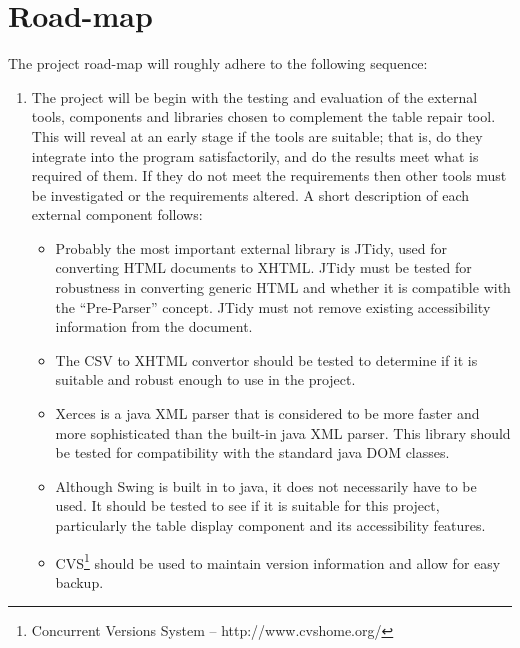 
\section{Road-map}

The project road-map will roughly adhere to the following sequence:

\begin{enumerate}

\item The project will be begin with the testing and evaluation of the external
tools, components and libraries chosen to complement the table repair tool.
This will reveal at an early stage if the tools are suitable; that is, do they
integrate into the program satisfactorily, and do the results meet what is
required of them. If they do not meet the requirements then other tools must be
investigated or the requirements altered. A short description of each external
component follows:

\begin{itemize}

\item Probably the most important external library is JTidy, used for converting
HTML documents to XHTML. JTidy must be tested for robustness in converting generic
HTML and whether it is compatible with the ``Pre-Parser'' concept. JTidy must not
remove existing accessibility information from the document.

\item The CSV to XHTML convertor should be tested to determine if it is suitable
and robust enough to use in the project.

\item Xerces is a java XML parser that is considered to be more faster and more
sophisticated than the built-in java XML parser. This library should be tested
for compatibility with the standard java DOM classes.

\item Although Swing is built in to java, it does not necessarily have to be
used. It should be tested to see if it is suitable for this project, particularly
the table display component and its accessibility features.

\item CVS\footnote{Concurrent Versions System -- http://www.cvshome.org/} should 
be used to maintain version information and allow for easy backup.


\end{itemize}
\end{enumerate}
